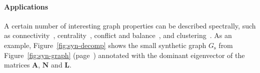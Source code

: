 \documentclass[11pt,a4paper]{book}
\begin{document}
\begin{table}[h!]
  \centering
  \caption{
    Graph characteristic matrices and their decompositions. 
  }
  \label{tab:matrix-decompositions}
\end{table}

\paragraph{Applications}
A certain number of interesting graph properties can be described
spectrally, such as connectivity~\cite{b294}, centrality~\cite{b133},
conflict and balance~\cite{kunegis:signed-kernels}, and
clustering~\cite{b304}.  As an example, Figure~\ref{fig:syn-decomp}
shows the small synthetic graph $G_{\mathrm s}$ from
Figure~\ref{fig:syn-graph} (page~\pageref{fig:syn-graph}) annotated with
the dominant eigenvector of the matrices $\mathbf A$, $\mathbf N$ and
$\mathbf L$.  
\end{document}
